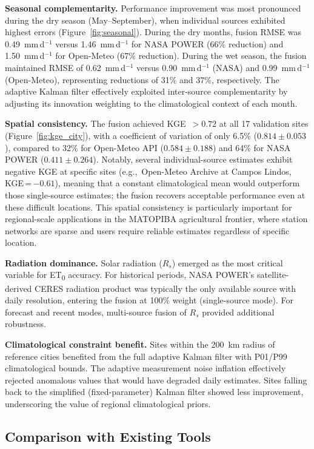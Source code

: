\documentclass[preprint,review,12pt]{elsarticle}
\begin{document}
\textbf{Seasonal complementarity.}
Performance improvement was most
pronounced during the dry season (May--September), when individual sources
exhibited highest errors (Figure~\ref{fig:seasonal}). During the dry months,
fusion RMSE was 0.49~mm\,d$^{-1}$ versus 1.46~mm\,d$^{-1}$ for NASA POWER
(66\% reduction) and 1.50~mm\,d$^{-1}$ for Open-Meteo (67\% reduction).
During the wet season, the fusion maintained RMSE of 0.62~mm\,d$^{-1}$
versus 0.90~mm\,d$^{-1}$ (NASA) and 0.99~mm\,d$^{-1}$ (Open-Meteo),
representing reductions of 31\% and 37\%, respectively. The adaptive Kalman
filter effectively exploited inter-source complementarity by adjusting
its innovation weighting to the climatological context of each month.

\textbf{Spatial consistency.}
The fusion achieved KGE~$>0.72$ at all
17 validation sites (Figure~\ref{fig:kge_city}), with a coefficient of
variation of only 6.5\% ($0.814 \pm 0.053$), compared to 32\% for
Open-Meteo API ($0.584 \pm 0.188$) and 64\% for NASA POWER
($0.411 \pm 0.264$). Notably, several individual-source estimates
exhibit negative KGE at specific sites (e.g.,\ Open-Meteo Archive at
Campos Lindos, KGE\,=\,$-0.61$), meaning that a constant climatological
mean would outperform those single-source estimates; the fusion recovers
acceptable performance even at these difficult locations. This spatial
consistency is particularly important for regional-scale applications in
the MATOPIBA agricultural frontier, where station networks are sparse
and users require reliable estimates regardless of specific location.

\textbf{Radiation dominance.} Solar radiation ($R_s$) emerged as the most
critical variable for ET\textsubscript{0} accuracy. For historical periods,
NASA POWER's satellite-derived CERES radiation product was typically the only
available source with daily resolution, entering the fusion at 100\% weight
(single-source mode). For forecast and recent modes, multi-source
fusion of $R_s$ provided additional robustness.

\textbf{Climatological constraint benefit.} Sites within the 200~km
radius of reference cities benefited from the full adaptive Kalman filter
with P01/P99 climatological bounds. The adaptive measurement noise
inflation effectively rejected anomalous values that would have degraded
daily estimates. Sites falling back to the simplified (fixed-parameter)
Kalman filter showed less improvement, underscoring the value of regional
climatological priors.


\subsection{Comparison with Existing Tools}
\label{subsec:comparison}
\end{document}
